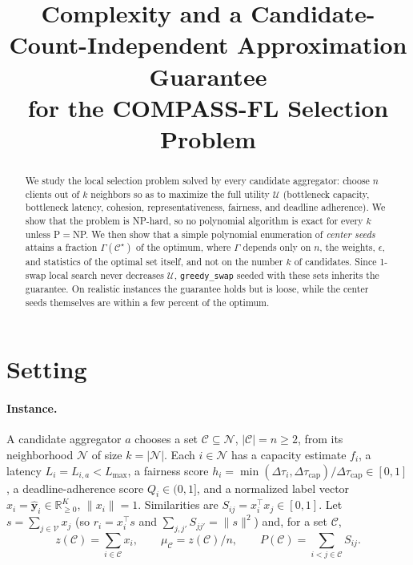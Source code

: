 \documentclass[10pt]{article}
\title{Complexity and a Candidate-Count-Independent Approximation Guarantee\\for the COMPASS-FL Selection Problem}
\date{}
\theoremstyle{remark}
\theoremstyle{definition}
\newcommand{\C}{\mathcal{C}}
\newcommand{\N}{\mathcal{N}}
\begin{document}
\maketitle

\begin{abstract}
We study the local selection problem solved by every candidate aggregator: choose $n$ clients out of $k$ neighbors so
as to maximize the full utility $\mathcal{U}$ (bottleneck capacity, bottleneck latency, cohesion, representativeness,
fairness, and deadline adherence). We show that the problem is NP-hard, so no polynomial algorithm is exact for every
$k$ unless P$=$NP. We then show that a simple polynomial enumeration of \emph{center seeds} attains a fraction
$\Gamma(\C^\star)$ of the optimum, where $\Gamma$ depends only on $n$, the weights, $\epsilon$, and statistics of the
optimal set itself, and not on the number $k$ of candidates. Since 1-swap local search never decreases $\mathcal{U}$,
\texttt{greedy\_swap} seeded with these sets inherits the guarantee. On realistic instances the guarantee holds but is
loose, while the center seeds themselves are within a few percent of the optimum.
\end{abstract}

\section{Setting}

\paragraph{Instance.} A candidate aggregator $a$ chooses a set $\C \subseteq \N$, $|\C| = n \ge 2$, from its
neighborhood $\N$ of size $k = |\N|$. Each $i \in \N$ has a capacity estimate $f_i$, a latency $L_i = L_{i,a} <
L_{\max}$, a fairness score $h_i = \min(\Delta\tau_i, \Delta\tau_{\text{cap}})/\Delta\tau_{\text{cap}} \in [0, 1]$, a
deadline-adherence score $Q_i \in (0, 1]$, and a normalized label vector $x_i = \hat{\mathbf{y}}_i \in
\mathbb{R}^K_{\ge 0}$, $\|x_i\| = 1$. Similarities are $S_{ij} = x_i^\top x_j \in [0, 1]$. Let $s = \sum_{j \in
\mathcal{V}} x_j$ (so $r_i = x_i^\top s$ and $\sum_{j,j'} S_{jj'} = \|s\|^2$) and, for a set $\C$,
\[
z(\C) = \sum_{i \in \C} x_i, \qquad \mu_\C = z(\C)/n, \qquad P(\C) = \sum_{i < j \in \C} S_{ij} .
\]
\end{document}
